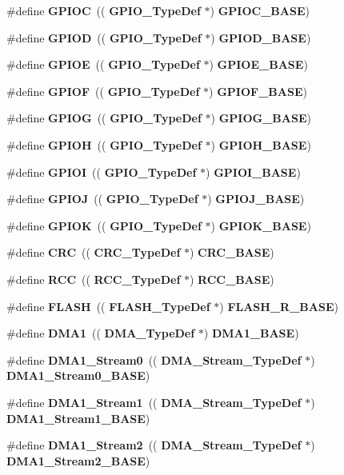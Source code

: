 \begin{DoxyCompactItemize}
\#define \textbf{ G\+P\+I\+OC}~((\textbf{ G\+P\+I\+O\+\_\+\+Type\+Def} $\ast$) \textbf{ G\+P\+I\+O\+C\+\_\+\+B\+A\+SE})
\item 
\#define \textbf{ G\+P\+I\+OD}~((\textbf{ G\+P\+I\+O\+\_\+\+Type\+Def} $\ast$) \textbf{ G\+P\+I\+O\+D\+\_\+\+B\+A\+SE})
\item 
\#define \textbf{ G\+P\+I\+OE}~((\textbf{ G\+P\+I\+O\+\_\+\+Type\+Def} $\ast$) \textbf{ G\+P\+I\+O\+E\+\_\+\+B\+A\+SE})
\item 
\#define \textbf{ G\+P\+I\+OF}~((\textbf{ G\+P\+I\+O\+\_\+\+Type\+Def} $\ast$) \textbf{ G\+P\+I\+O\+F\+\_\+\+B\+A\+SE})
\item 
\#define \textbf{ G\+P\+I\+OG}~((\textbf{ G\+P\+I\+O\+\_\+\+Type\+Def} $\ast$) \textbf{ G\+P\+I\+O\+G\+\_\+\+B\+A\+SE})
\item 
\#define \textbf{ G\+P\+I\+OH}~((\textbf{ G\+P\+I\+O\+\_\+\+Type\+Def} $\ast$) \textbf{ G\+P\+I\+O\+H\+\_\+\+B\+A\+SE})
\item 
\#define \textbf{ G\+P\+I\+OI}~((\textbf{ G\+P\+I\+O\+\_\+\+Type\+Def} $\ast$) \textbf{ G\+P\+I\+O\+I\+\_\+\+B\+A\+SE})
\item 
\#define \textbf{ G\+P\+I\+OJ}~((\textbf{ G\+P\+I\+O\+\_\+\+Type\+Def} $\ast$) \textbf{ G\+P\+I\+O\+J\+\_\+\+B\+A\+SE})
\item 
\#define \textbf{ G\+P\+I\+OK}~((\textbf{ G\+P\+I\+O\+\_\+\+Type\+Def} $\ast$) \textbf{ G\+P\+I\+O\+K\+\_\+\+B\+A\+SE})
\item 
\#define \textbf{ C\+RC}~((\textbf{ C\+R\+C\+\_\+\+Type\+Def} $\ast$) \textbf{ C\+R\+C\+\_\+\+B\+A\+SE})
\item 
\#define \textbf{ R\+CC}~((\textbf{ R\+C\+C\+\_\+\+Type\+Def} $\ast$) \textbf{ R\+C\+C\+\_\+\+B\+A\+SE})
\item 
\#define \textbf{ F\+L\+A\+SH}~((\textbf{ F\+L\+A\+S\+H\+\_\+\+Type\+Def} $\ast$) \textbf{ F\+L\+A\+S\+H\+\_\+\+R\+\_\+\+B\+A\+SE})
\item 
\#define \textbf{ D\+M\+A1}~((\textbf{ D\+M\+A\+\_\+\+Type\+Def} $\ast$) \textbf{ D\+M\+A1\+\_\+\+B\+A\+SE})
\item 
\#define \textbf{ D\+M\+A1\+\_\+\+Stream0}~((\textbf{ D\+M\+A\+\_\+\+Stream\+\_\+\+Type\+Def} $\ast$) \textbf{ D\+M\+A1\+\_\+\+Stream0\+\_\+\+B\+A\+SE})
\item 
\#define \textbf{ D\+M\+A1\+\_\+\+Stream1}~((\textbf{ D\+M\+A\+\_\+\+Stream\+\_\+\+Type\+Def} $\ast$) \textbf{ D\+M\+A1\+\_\+\+Stream1\+\_\+\+B\+A\+SE})
\item 
\#define \textbf{ D\+M\+A1\+\_\+\+Stream2}~((\textbf{ D\+M\+A\+\_\+\+Stream\+\_\+\+Type\+Def} $\ast$) \textbf{ D\+M\+A1\+\_\+\+Stream2\+\_\+\+B\+A\+SE})

\end{DoxyCompactItemize}
